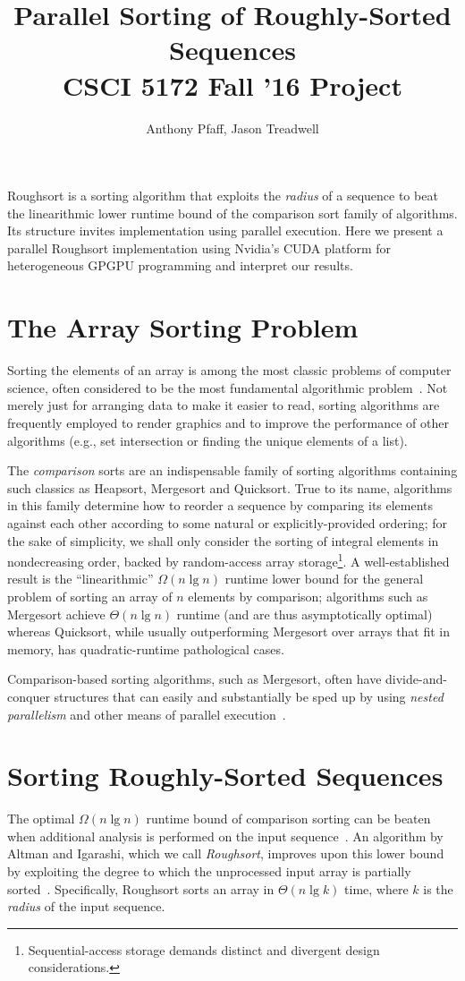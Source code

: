 \documentclass[letterpaper, 12pt]{article}
\title{Parallel Sorting of Roughly-Sorted Sequences\\CSCI 5172 Fall '16 Project}
\author{Anthony Pfaff, Jason Treadwell}
\let\supercite\cite
\renewcommand{\cite}[1]{\textnormal{~\supercite{#1}}}
\begin{document}
\maketitle

Roughsort is a sorting algorithm that exploits the \textit{radius} of a sequence to beat the linearithmic
  lower runtime bound of the comparison sort family of algorithms.
Its structure invites implementation using parallel execution.
Here we present a parallel Roughsort implementation using Nvidia's CUDA platform for heterogeneous GPGPU programming and
  interpret our results.

\section{The Array Sorting Problem}
Sorting the elements of an array is among the most classic problems of computer science, often
  considered to be the most fundamental algorithmic problem\cite{clrs}.
Not merely just for arranging data to make it easier to read, sorting algorithms are frequently employed to render graphics
  and to improve the performance of other algorithms (e.g., set intersection or finding the unique elements of a list).

The \textit{comparison} sorts are an indispensable family of sorting algorithms containing such classics as Heapsort,
  Mergesort and Quicksort.
True to its name, algorithms in this family determine how to reorder a sequence by comparing its elements against each other
  according to some natural or explicitly-provided ordering;
  for the sake of simplicity, we shall only consider the sorting of integral elements in nondecreasing order, backed by
  random-access array storage\footnote{Sequential-access storage demands distinct and divergent design considerations.}.
A well-established result is the ``linearithmic'' $\Omega(n \lg n)$ runtime lower bound for the general problem of sorting
  an array of $n$ elements by comparison; algorithms such as Mergesort achieve $\Theta(n \lg n)$ runtime (and are thus
  asymptotically optimal) whereas Quicksort, while usually outperforming Mergesort over arrays that fit in memory,
  has quadratic-runtime pathological cases.

Comparison-based sorting algorithms, such as Mergesort, often have divide-and-conquer structures that can easily and
  substantially be sped up by using \textit{nested parallelism} and other means of parallel execution\cite{clrs}.

\section{Sorting Roughly-Sorted Sequences}
The optimal $\Omega(n \lg n)$ runtime bound of comparison sorting can be beaten when additional analysis is performed on the
  input sequence\cite{clrs}.
An algorithm by Altman and Igarashi, which we call \textit{Roughsort}, improves upon this lower bound by exploiting the degree
  to which the unprocessed input array is partially sorted\cite{altman89}.
Specifically, Roughsort sorts an array in $\Theta(n \lg k)$ time, where $k$ is the \textit{radius} of the input sequence.
\end{document}
